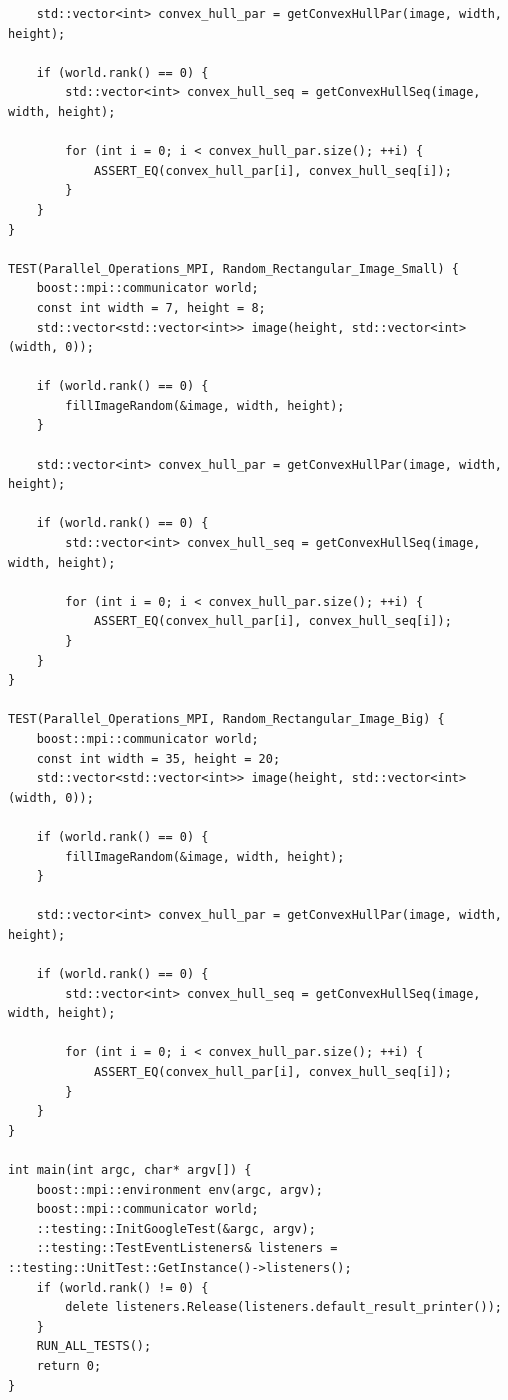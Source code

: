 \documentclass[a4paper, 12pt]{extarticle}
\begin{document}
\begin{verbatim}
	std::vector<int> convex_hull_par = getConvexHullPar(image, width, height);
	
	if (world.rank() == 0) {
		std::vector<int> convex_hull_seq = getConvexHullSeq(image, width, height);
		
		for (int i = 0; i < convex_hull_par.size(); ++i) {
			ASSERT_EQ(convex_hull_par[i], convex_hull_seq[i]);
		}
	}
}

TEST(Parallel_Operations_MPI, Random_Rectangular_Image_Small) {
	boost::mpi::communicator world;
	const int width = 7, height = 8;
	std::vector<std::vector<int>> image(height, std::vector<int>(width, 0));
	
	if (world.rank() == 0) {
		fillImageRandom(&image, width, height);
	}
	
	std::vector<int> convex_hull_par = getConvexHullPar(image, width, height);
	
	if (world.rank() == 0) {
		std::vector<int> convex_hull_seq = getConvexHullSeq(image, width, height);
		
		for (int i = 0; i < convex_hull_par.size(); ++i) {
			ASSERT_EQ(convex_hull_par[i], convex_hull_seq[i]);
		}
	}
}

TEST(Parallel_Operations_MPI, Random_Rectangular_Image_Big) {
	boost::mpi::communicator world;
	const int width = 35, height = 20;
	std::vector<std::vector<int>> image(height, std::vector<int>(width, 0));
	
	if (world.rank() == 0) {
		fillImageRandom(&image, width, height);
	}
	
	std::vector<int> convex_hull_par = getConvexHullPar(image, width, height);
	
	if (world.rank() == 0) {
		std::vector<int> convex_hull_seq = getConvexHullSeq(image, width, height);
		
		for (int i = 0; i < convex_hull_par.size(); ++i) {
			ASSERT_EQ(convex_hull_par[i], convex_hull_seq[i]);
		}
	}
}

int main(int argc, char* argv[]) {
	boost::mpi::environment env(argc, argv);
	boost::mpi::communicator world;
	::testing::InitGoogleTest(&argc, argv);
	::testing::TestEventListeners& listeners = ::testing::UnitTest::GetInstance()->listeners();
	if (world.rank() != 0) {
		delete listeners.Release(listeners.default_result_printer());
	}
	RUN_ALL_TESTS();
	return 0;
}
\end{verbatim}
\end{document}
